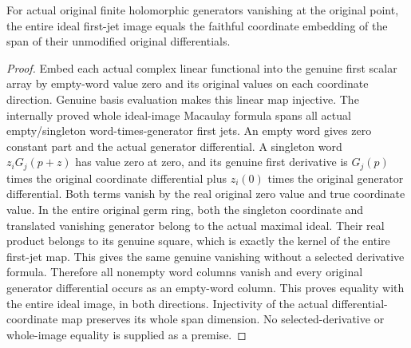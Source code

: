 \begin{lemma}
\label{hir:actual-whole-first-ideal-cotangent-image}
\leanok
{}
For actual original finite holomorphic generators vanishing at the original
point, the entire ideal first-jet image equals the faithful coordinate
embedding of the span of their unmodified original differentials.
\end{lemma}
\begin{proof}
Embed each actual complex linear functional into the genuine first scalar
array by empty-word value zero and its original values on each coordinate
direction. Genuine basis evaluation makes this linear map injective.
The internally proved whole ideal-image Macaulay formula spans all actual
empty/singleton word-times-generator first jets. An empty word gives zero
constant part and the actual generator differential. A singleton word
$z_iG_j(p+z)$ has value zero at zero, and its genuine first derivative is
$G_j(p)$ times the original coordinate differential plus $z_i(0)$ times
the original generator differential. Both terms vanish by the real original
zero value and true coordinate value. In the entire original germ ring,
both the singleton coordinate and translated vanishing generator belong
to the actual maximal ideal. Their real product belongs to its genuine
square, which is exactly the kernel of the entire first-jet map. This
gives the same genuine vanishing without a selected derivative formula.
Therefore all nonempty word columns
vanish and every original generator differential occurs as an empty-word
column. This proves equality with the entire ideal image, in both directions.
Injectivity of the actual differential-coordinate map preserves its
whole span dimension. No selected-derivative or whole-image equality is
supplied as a premise.
\end{proof}

